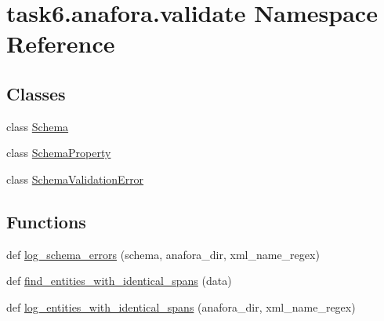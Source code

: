 \hypertarget{namespacetask6_1_1anafora_1_1validate}{}\section{task6.\+anafora.\+validate Namespace Reference}
\label{namespacetask6_1_1anafora_1_1validate}
\subsection*{Classes}
\begin{DoxyCompactItemize}
\item 
class \hyperlink{classtask6_1_1anafora_1_1validate_1_1Schema}{Schema}
\item 
class \hyperlink{classtask6_1_1anafora_1_1validate_1_1SchemaProperty}{Schema\+Property}
\item 
class \hyperlink{classtask6_1_1anafora_1_1validate_1_1SchemaValidationError}{Schema\+Validation\+Error}
\end{DoxyCompactItemize}
\subsection*{Functions}
\begin{DoxyCompactItemize}
\item 
def \hyperlink{namespacetask6_1_1anafora_1_1validate_af439ad4edc7f6930cf79fa95906eb7f4}{log\+\_\+schema\+\_\+errors} (schema, anafora\+\_\+dir, xml\+\_\+name\+\_\+regex)
\item 
def \hyperlink{namespacetask6_1_1anafora_1_1validate_abf9a7c1cb1abdaf8fb17e797e3830d96}{find\+\_\+entities\+\_\+with\+\_\+identical\+\_\+spans} (data)
\item 
def \hyperlink{namespacetask6_1_1anafora_1_1validate_a253ca8a713a1aff34c1e68229c3c37ad}{log\+\_\+entities\+\_\+with\+\_\+identical\+\_\+spans} (anafora\+\_\+dir, xml\+\_\+name\+\_\+regex)
\end{DoxyCompactItemize}
